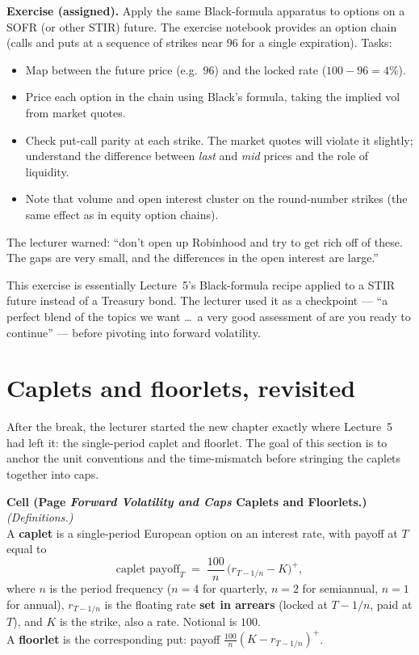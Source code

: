 \begin{exerciseblock}
\textbf{Exercise (assigned).} Apply the same Black-formula apparatus
to options on a SOFR (or other STIR) future. The exercise notebook
provides an option chain (calls and puts at a sequence of strikes
near $96$ for a single expiration). Tasks:
\begin{itemize}
  \item Map between the future price (e.g.\ $96$) and the locked rate
        ($100 - 96 = 4\%$).
  \item Price each option in the chain using Black's formula, taking
        the implied vol from market quotes.
  \item Check put-call parity at each strike. The market quotes will
        violate it slightly; understand the difference between
        \emph{last} and \emph{mid} prices and the role of liquidity.
  \item Note that volume and open interest cluster on the
        round-number strikes (the same effect as in equity option
        chains).
\end{itemize}
The lecturer warned: ``don't open up Robinhood and try to get rich
off of these. The gaps are very small, and the differences in the
open interest are large.''
\end{exerciseblock}

This exercise is essentially Lecture~5's Black-formula recipe applied
to a STIR future instead of a Treasury bond. The lecturer used it as
a checkpoint --- ``a perfect blend of the topics we want \ldots\ a very
good assessment of are you ready to continue'' --- before pivoting
into forward volatility.

\section{Caplets and floorlets, revisited}\label{L6-sec:caplets}

After the break, the lecturer started the new chapter exactly where
Lecture~5 had left it: the single-period caplet and floorlet. The
goal of this section is to anchor the unit conventions and the
time-mismatch before stringing the caplets together into caps.

\begin{keyblock}
\textbf{Cell (Page \emph{Forward Volatility and Caps} \textperiodcentered{}
Caplets and Floorlets.)}
\emph{(Definitions.)}\\
A \textbf{caplet} is a single-period European option on an interest
rate, with payoff at $T$ equal to
\[
  \text{caplet payoff}_T \;=\; \frac{100}{n}\,\bigl(r_{T-1/n} - K\bigr)^{+},
\]
where $n$ is the period frequency ($n=4$ for quarterly, $n=2$ for
semiannual, $n=1$ for annual), $r_{T-1/n}$ is the floating rate
\textbf{set in arrears} (locked at $T - 1/n$, paid at $T$), and $K$ is
the strike, also a rate. Notional is $100$.\\
A \textbf{floorlet} is the corresponding put: payoff
$\frac{100}{n}(K - r_{T-1/n})^{+}$.
\end{keyblock}

